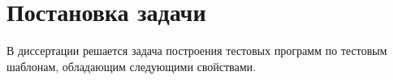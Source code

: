 %
%

\section{Постановка задачи}

В диссертации решается задача построения тестовых программ по
тестовым шаблонам, обладающим следующими свойствами.


